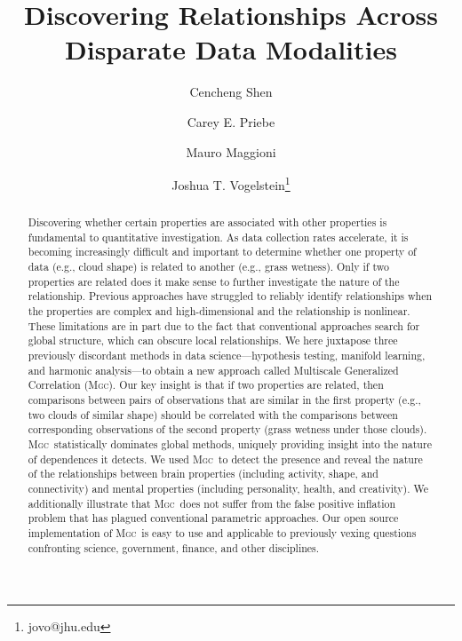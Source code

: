 \documentclass[11pt]{article}
\providecommand{\sct}[1]{{\normalfont\textsc{#1}}}
\newcommand{\Mgc}{\sct{Mgc}}
\begin{document}
\def\spacingset#1{\renewcommand{\baselinestretch}%
{#1}\small\normalsize} \spacingset{1}

\title{\vspace{-2em}\bf Discovering Relationships Across Disparate Data Modalities}
\author[1,2]{Cencheng Shen} %
\author[1,3]{Carey E. Priebe}%
\author[3,4,6]{Mauro Maggioni}%
\author[1,5,6]{Joshua T. Vogelstein\thanks{jovo@jhu.edu}}
\maketitle

\begin{abstract}
Discovering whether certain properties are associated with other properties is fundamental to quantitative investigation.
As data collection rates accelerate, 
it is becoming increasingly difficult and important to determine whether one property of  data (e.g., cloud shape) is related to another (e.g., grass wetness). Only if two properties are related does it make sense to further investigate the nature of the relationship. Previous approaches have struggled to reliably identify relationships when the properties are complex and high-dimensional and the relationship is nonlinear. 
These limitations are in part due to the fact that conventional approaches search for global structure, 
which can obscure local relationships.
We here juxtapose three previously discordant
methods in data science---hypothesis testing, manifold learning, and harmonic analysis---to obtain a new approach called Multiscale Generalized Correlation (\Mgc).  
Our key insight is that if two properties are related, 
then comparisons between pairs of observations that are similar in the first property (e.g., two clouds of similar shape) should be correlated with the comparisons between corresponding observations of the second property (grass wetness under those clouds).
% 
\Mgc~statistically dominates global methods, uniquely providing insight into the nature of dependences it detects. 
We used \Mgc~to detect the presence and reveal the nature
of the relationships between brain properties (including activity, shape, and connectivity) 
and mental properties (including personality, health, and creativity). 
We additionally illustrate that \Mgc~does not suffer from the false positive inflation problem that has plagued conventional parametric approaches.  Our open source implementation of \Mgc~is easy to use and applicable to previously vexing questions confronting science, government, finance, and  other disciplines. 
\end{abstract}
\end{document}
